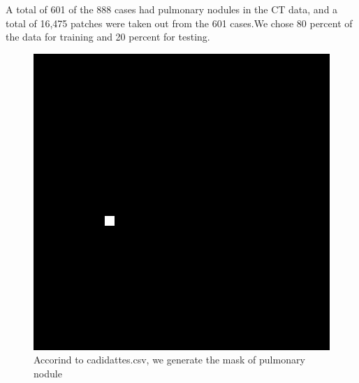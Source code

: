 \documentclass[conference]{IEEEtran}
\begin{document}
\begin{CJK}{UTF8}{gbsn}
A total of 601 of the 888 cases had pulmonary nodules in the CT data, and a total of 16,475 patches were taken out from the 601 cases.We chose 80 percent of the data for training and 20 percent for testing.
\begin{figure}[htbp]
    \centerline{\includegraphics[scale=0.5]{1.jpg}}
    \caption{Accorind to cadidattes.csv, we generate the mask of pulmonary nodule}
    \label{fig1}
    \end{figure}

\end{CJK}
\end{document}
